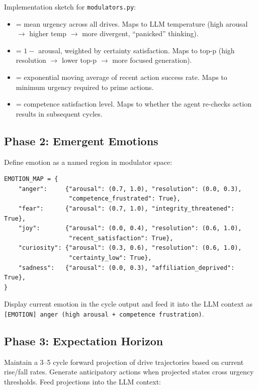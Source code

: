 \documentclass[11pt,letterpaper]{article}
\begin{document}
Implementation sketch for \texttt{modulators.py}:

\begin{itemize}
  \item {} = mean urgency across all drives. Maps to LLM
    temperature (high arousal $\rightarrow$ higher temp $\rightarrow$ more
    divergent, ``panicked'' thinking).
  \item {} = $1 -$ arousal, weighted by certainty
    satisfaction. Maps to top-p (high resolution $\rightarrow$ lower top-p
    $\rightarrow$ more focused generation).
  \item {} = exponential moving average of
    recent action success rate. Maps to minimum urgency required to prime
    actions.
  \item {} = competence satisfaction level. Maps to
    whether the agent re-checks action results in subsequent cycles.
\end{itemize}

\subsection{Phase 2: Emergent Emotions}

Define emotion as a named region in modulator space:

\begin{verbatim}
EMOTION_MAP = {
    "anger":     {"arousal": (0.7, 1.0), "resolution": (0.0, 0.3),
                  "competence_frustrated": True},
    "fear":      {"arousal": (0.7, 1.0), "integrity_threatened": True},
    "joy":       {"arousal": (0.0, 0.4), "resolution": (0.6, 1.0),
                  "recent_satisfaction": True},
    "curiosity": {"arousal": (0.3, 0.6), "resolution": (0.6, 1.0),
                  "certainty_low": True},
    "sadness":   {"arousal": (0.0, 0.3), "affiliation_deprived": True},
}
\end{verbatim}

Display current emotion in the cycle output and feed it into the LLM
context as \texttt{[EMOTION] anger (high arousal + competence frustration)}.

\subsection{Phase 3: Expectation Horizon}

Maintain a 3--5 cycle forward projection of drive trajectories based on
current rise/fall rates. Generate anticipatory actions when projected
states cross urgency thresholds. Feed projections into the LLM context:
\end{document}
